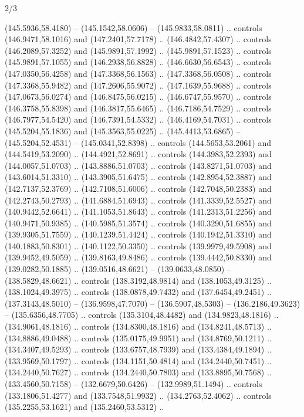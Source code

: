 \begin{flagdescription}{2/3}
\begin{scope}[xshift=0.5\flaglength,yshift=0.5\flagwidth,scale=\flagwidth/180]
\begin{scope}[y=0.8pt, x=0.8pt, yscale=-1,shift={(-168.75,-108.75)}]
  (145.5936,58.4180) -- (145.1542,58.0606) -- (145.9833,58.0811) .. controls
  (146.9471,58.1016) and (147.2401,57.7178) .. (146.4842,57.4307) .. controls
  (146.2089,57.3252) and (145.9891,57.1992) .. (145.9891,57.1523) .. controls
  (145.9891,57.1055) and (146.2938,56.8828) .. (146.6630,56.6543) .. controls
  (147.0350,56.4258) and (147.3368,56.1563) .. (147.3368,56.0508) .. controls
  (147.3368,55.9482) and (147.2606,55.9072) .. (147.1639,55.9688) .. controls
  (147.0673,56.0274) and (146.8475,56.0215) .. (146.6747,55.9570) .. controls
  (146.3758,55.8398) and (146.3817,55.6465) .. (146.7186,54.7529) .. controls
  (146.7977,54.5420) and (146.7391,54.5332) .. (146.4169,54.7031) .. controls
  (145.5204,55.1836) and (145.3563,55.0225) .. (145.4413,53.6865) --
  (145.5204,52.4531) -- (145.0341,52.8398) .. controls (144.5653,53.2061) and
  (144.5419,53.2090) .. (144.4921,52.8691) .. controls (144.3983,52.2393) and
  (144.0057,51.0703) .. (143.8886,51.0703) .. controls (143.8271,51.0703) and
  (143.6014,51.3310) .. (143.3905,51.6475) .. controls (142.8954,52.3887) and
  (142.7137,52.3769) .. (142.7108,51.6006) .. controls (142.7048,50.2383) and
  (142.2743,50.2793) .. (141.6884,51.6943) .. controls (141.3339,52.5527) and
  (140.9442,52.6641) .. (141.1053,51.8643) .. controls (141.2313,51.2256) and
  (140.9471,50.9385) .. (140.5985,51.3574) .. controls (140.3290,51.6855) and
  (139.9305,51.7559) .. (140.1239,51.4424) .. controls (140.1942,51.3310) and
  (140.1883,50.8301) .. (140.1122,50.3350) .. controls (139.9979,49.5908) and
  (139.9452,49.5059) .. (139.8163,49.8486) .. controls (139.4442,50.8330) and
  (139.0282,50.1885) .. (139.0516,48.6621) -- (139.0633,48.0850) --
  (138.5829,48.6621) .. controls (138.3192,48.9814) and (138.1053,49.3125) ..
  (138.1024,49.3975) .. controls (138.0878,49.7432) and (137.6454,49.2451) ..
  (137.3143,48.5010) -- (136.9598,47.7070) -- (136.5907,48.5303) --
  (136.2186,49.3623) -- (135.6356,48.7705) .. controls (135.3104,48.4482) and
  (134.9823,48.1816) .. (134.9061,48.1816) .. controls (134.8300,48.1816) and
  (134.8241,48.5713) .. (134.8886,49.0488) .. controls (135.0175,49.9951) and
  (134.8769,50.1211) .. (134.3407,49.5293) .. controls (133.6757,48.7939) and
  (133.4384,49.1894) .. (133.9569,50.1797) .. controls (134.1151,50.4814) and
  (134.2440,50.7451) .. (134.2440,50.7627) .. controls (134.2440,50.7803) and
  (133.8895,50.7568) .. (133.4560,50.7158) -- (132.6679,50.6426) --
  (132.9989,51.1494) .. controls (133.1806,51.4277) and (133.7548,51.9932) ..
  (134.2763,52.4062) .. controls (135.2255,53.1621) and (135.2460,53.5312) ..

\end{scope}
\end{scope}
\end{flagdescription}

